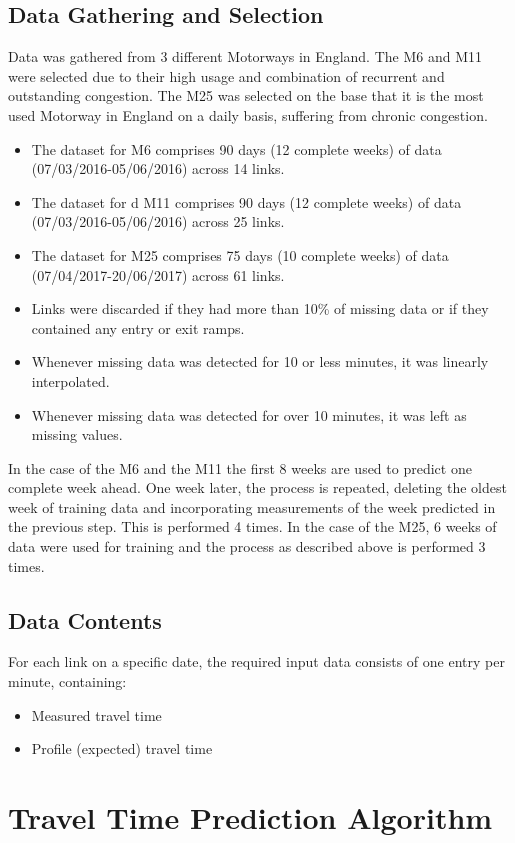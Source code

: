 \documentclass[letterpaper, 10 pt, conference]{ieeeconf}  %
\begin{document}
\subsection{Data Gathering and Selection}
Data was gathered from 3 different Motorways in England.
The M6 and M11 were selected due to their high usage and combination of recurrent and outstanding congestion. 
The M25 was selected on the base that it is the most used Motorway in England on a daily basis, suffering from chronic congestion.
\begin{itemize}
	\item The dataset for M6 comprises 90 days (12 complete weeks) of data (07/03/2016-05/06/2016) across 14 links.
	\item The dataset for d M11 comprises 90 days (12 complete weeks) of data (07/03/2016-05/06/2016) across 25 links.
	\item The dataset for M25 comprises 75 days (10 complete weeks) of data (07/04/2017-20/06/2017) across 61 links.
	\item Links were discarded if they had more than 10\% of missing data or if they contained any entry or exit ramps.
	\item Whenever missing data was detected for 10 or less minutes, it was linearly interpolated.
	\item Whenever missing data was detected for over 10 minutes, it was left as missing values.
\end{itemize}
In the case of the M6 and the M11 the first 8 weeks are used to predict one complete week ahead.
One week later, the process is repeated, deleting the oldest week of training data and incorporating measurements of the week predicted in the previous step. This is performed 4 times.
In the case of the M25, 6 weeks of data were used for training and the process as described above is performed 3 times.
\subsection{Data Contents}
For each link on a specific date, the required input data consists of one entry per minute, containing:
\begin{itemize}
	\item Measured travel time
	\item Profile (expected) travel time 	
\end{itemize}
\section{Travel Time Prediction Algorithm} \label{algorithm}
\end{document}
